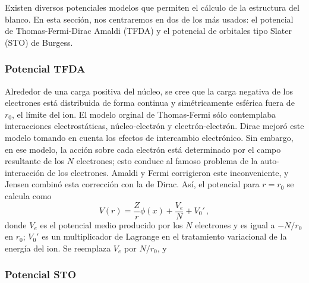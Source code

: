Existen diversos potenciales modelos que permiten el cálculo de la
estructura del blanco. En esta sección, nos centraremos en dos de los más 
usados: el potencial de Thomas-Fermi-Dirac Amaldi (TFDA) y el potencial 
de orbitales tipo Slater (STO) de Burgess.

\subsubsection*{Potencial TFDA}

Alrededor de una carga positiva del núcleo, se cree que la carga negativa 
de los electrones está distribuida de forma continua y simétricamente 
esférica fuera de $r_0$, el límite del ion. El modelo orginal de 
Thomas-Fermi sólo contemplaba interacciones electrostáticas, 
núcleo-electrón y electrón-electrón. Dirac mejoró este modelo tomando en
cuenta los efectos de intercambio electrónico. Sin embargo, en ese modelo,
la acción sobre cada electrón está determinado por el campo resultante 
de los $N$ electrones; esto conduce al famoso problema de la 
auto-interacción de los electrones. Amaldi y Fermi corrigieron este 
inconveniente, y Jensen combinó esta corrección con la de Dirac. Así, el 
potencial para $r=r_0$ se calcula como
\begin{equation}
V(r) = \frac{Z}{r}\phi(x) + \frac{V_e}{N}+V_0'\,,
\end{equation}
donde $V_e$ es el potencial medio producido por los $N$ electrones y es
igual a $-N/r_0$ en $r_0$; $V_0'$ es un multiplicador de Lagrange en el 
tratamiento variacional de la energía del ion. Se reemplaza $V_e$ por 
$N/r_0$, y 

\subsubsection*{Potencial STO}

